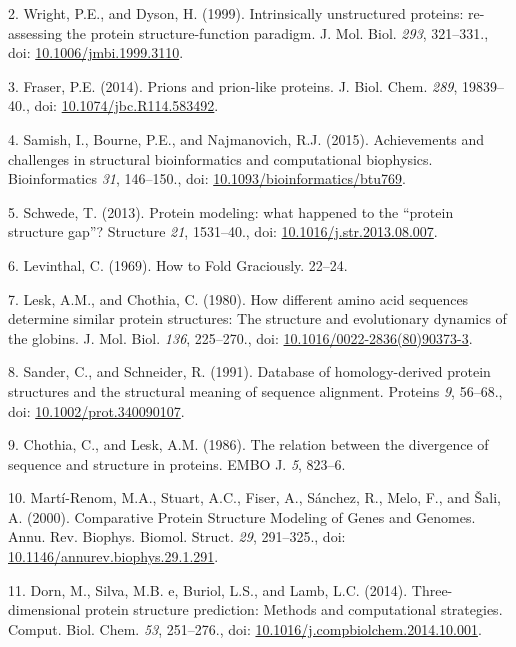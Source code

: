 \documentclass[11pt,a4paper,twoside]{book}
\theoremstyle{definition}
\theoremstyle{definition}
\theoremstyle{remark}
\begin{document}
\hypertarget{ref-Wright1999}{}
2. Wright, P.E., and Dyson, H. (1999). Intrinsically unstructured
proteins: re-assessing the protein structure-function paradigm. J. Mol.
Biol. \emph{293}, 321--331., doi:
\href{https://doi.org/10.1006/jmbi.1999.3110}{10.1006/jmbi.1999.3110}.

\hypertarget{ref-Fraser2014}{}
3. Fraser, P.E. (2014). Prions and prion-like proteins. J. Biol. Chem.
\emph{289}, 19839--40., doi:
\href{https://doi.org/10.1074/jbc.R114.583492}{10.1074/jbc.R114.583492}.

\hypertarget{ref-Samish2015}{}
4. Samish, I., Bourne, P.E., and Najmanovich, R.J. (2015). Achievements
and challenges in structural bioinformatics and computational
biophysics. Bioinformatics \emph{31}, 146--150., doi:
\href{https://doi.org/10.1093/bioinformatics/btu769}{10.1093/bioinformatics/btu769}.

\hypertarget{ref-Schwede2013}{}
5. Schwede, T. (2013). Protein modeling: what happened to the ``protein
structure gap''? Structure \emph{21}, 1531--40., doi:
\href{https://doi.org/10.1016/j.str.2013.08.007}{10.1016/j.str.2013.08.007}.

\hypertarget{ref-Levinthal1969}{}
6. Levinthal, C. (1969). How to Fold Graciously. 22--24.

\hypertarget{ref-Lesk1980}{}
7. Lesk, A.M., and Chothia, C. (1980). How different amino acid
sequences determine similar protein structures: The structure and
evolutionary dynamics of the globins. J. Mol. Biol. \emph{136},
225--270., doi:
\href{https://doi.org/10.1016/0022-2836(80)90373-3}{10.1016/0022-2836(80)90373-3}.

\hypertarget{ref-Sander1991}{}
8. Sander, C., and Schneider, R. (1991). Database of homology-derived
protein structures and the structural meaning of sequence alignment.
Proteins \emph{9}, 56--68., doi:
\href{https://doi.org/10.1002/prot.340090107}{10.1002/prot.340090107}.

\hypertarget{ref-Chothia1986}{}
9. Chothia, C., and Lesk, A.M. (1986). The relation between the
divergence of sequence and structure in proteins. EMBO J. \emph{5},
823--6.

\hypertarget{ref-Marti-Renom2000}{}
10. Martí-Renom, M.A., Stuart, A.C., Fiser, A., Sánchez, R., Melo, F.,
and Šali, A. (2000). Comparative Protein Structure Modeling of Genes and
Genomes. Annu. Rev. Biophys. Biomol. Struct. \emph{29}, 291--325., doi:
\href{https://doi.org/10.1146/annurev.biophys.29.1.291}{10.1146/annurev.biophys.29.1.291}.

\hypertarget{ref-Dorn2014}{}
11. Dorn, M., Silva, M.B. e, Buriol, L.S., and Lamb, L.C. (2014).
Three-dimensional protein structure prediction: Methods and
computational strategies. Comput. Biol. Chem. \emph{53}, 251--276., doi:
\href{https://doi.org/10.1016/j.compbiolchem.2014.10.001}{10.1016/j.compbiolchem.2014.10.001}.
\end{document}
